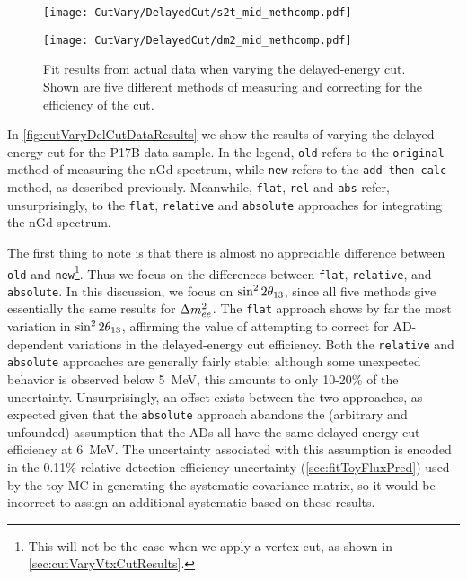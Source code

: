 \documentclass[../thesis.tex]{subfiles}
\begin{document}
\begin{figure}[ht]
  \begin{minipage}{0.5\linewidth}%
    \texttt{[image: CutVary/DelayedCut/s2t\_mid\_methcomp.pdf]}%
  \end{minipage}%
  \begin{minipage}{0.5\linewidth}%
    \texttt{[image: CutVary/DelayedCut/dm2\_mid\_methcomp.pdf]}%
  \end{minipage}%
  \caption{Fit results from actual data when varying the delayed-energy cut. Shown are five different methods of measuring and correcting for the efficiency of the cut.}
  \label{fig:cutVaryDelCutDataResults}
\end{figure}

In \autoref{fig:cutVaryDelCutDataResults} we show the results of varying the delayed-energy cut for the P17B data sample. In the legend, \texttt{old} refers to the \texttt{original} method of measuring the nGd spectrum, while \texttt{new} refers to the \texttt{add-then-calc} method, as described previously. Meanwhile, \texttt{flat}, \texttt{rel} and \texttt{abs} refer, unsurprisingly, to the \texttt{flat}, \texttt{relative} and \texttt{absolute} approaches for integrating the nGd spectrum.

The first thing to note is that there is almost no appreciable difference between \texttt{old} and \texttt{new}\footnote{This will not be the case when we apply a vertex cut, as shown in \autoref{sec:cutVaryVtxCutResults}.}. Thus we focus on the differences between \texttt{flat}, \texttt{relative}, and \texttt{absolute}. In this discussion, we focus on $\sin^2 2\theta_{13}$, since all five methods give essentially the same results for $\Delta m^2_{ee}$. The \texttt{flat} approach shows by far the most variation in $\sin^2 2\theta_{13}$, affirming the value of attempting to correct for AD-dependent variations in the delayed-energy cut efficiency. Both the \texttt{relative} and \texttt{absolute} approaches are generally fairly stable; although some unexpected behavior is observed below 5~MeV, this amounts to only 10-20\% of the uncertainty. Unsurprisingly, an offset exists between the two approaches, as expected given that the \texttt{absolute} approach abandons the (arbitrary and unfounded) assumption that the ADs all have the same delayed-energy cut efficiency at 6~MeV. The uncertainty associated with this assumption is encoded in the 0.11\% relative detection efficiency uncertainty (\autoref{sec:fitToyFluxPred}) used by the toy MC in generating the systematic covariance matrix, so it would be incorrect to assign an additional systematic based on these results.
\end{document}
